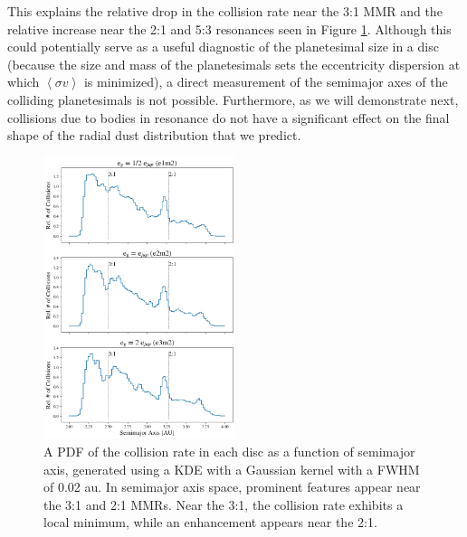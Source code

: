 This explains the relative drop in the collision rate near the 3:1 MMR and the relative increase near the 2:1 and 5:3 resonances 
seen in Figure \ref{fig:coll_hist_a}. Although this could potentially serve as a useful diagnostic of the planetesimal size in a disc 
(because the size and mass of the planetesimals sets the eccentricity dispersion at which $\left< \sigma v \right>$ is minimized), 
a direct measurement of the semimajor axes of the colliding planetesimals is not possible. Furthermore, as we will demonstrate 
next, collisions due to bodies in resonance do not have a significant effect on the final shape of the radial dust distribution that 
we predict.

\begin{figure}
\begin{center}
    \includegraphics[width=0.5\textwidth]{figures/grind/coll_hist_a.png}
    \caption{A PDF of the collision rate in each disc as a function of semimajor axis, generated using a KDE with a Gaussian 
    kernel with a FWHM of 0.02 au. In semimajor axis space, prominent features appear near the 3:1 and 2:1 MMRs. Near the 
    3:1, the collision rate exhibits a local minimum, while an enhancement appears near the 2:1.\label{fig:coll_hist_a}}
\end{center}
\end{figure}

